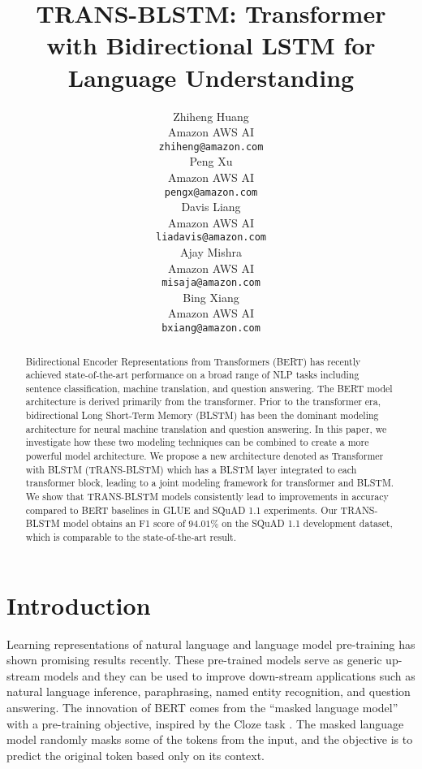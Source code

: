 \documentclass[11pt,a4paper]{article}
\title{TRANS-BLSTM: Transformer with Bidirectional LSTM for Language Understanding}
\author{Zhiheng Huang \\
  Amazon AWS AI \\
  \texttt{zhiheng@amazon.com} \\\And
  Peng Xu \\
  Amazon AWS AI \\
  \texttt{pengx@amazon.com} \\\And
  Davis Liang \\
  Amazon AWS AI \\
  \texttt{liadavis@amazon.com} \\\AND
  Ajay Mishra \\
  Amazon AWS AI \\
  \texttt{misaja@amazon.com} \\\And
  Bing Xiang \\
  Amazon AWS AI \\
  \texttt{bxiang@amazon.com} \\  
  }
\date{}
\begin{document}
\maketitle
\begin{abstract}
Bidirectional Encoder Representations from Transformers (BERT) has recently achieved state-of-the-art performance on a broad range of NLP tasks including sentence classification, machine translation, and question answering. The BERT model architecture is derived primarily from the transformer. Prior to the transformer era, bidirectional Long Short-Term Memory (BLSTM) has been the dominant modeling architecture for neural machine translation and question answering. In this paper, we investigate how these two modeling techniques can be combined to create a more powerful model architecture. We propose a new architecture denoted as Transformer with BLSTM (TRANS-BLSTM) which has a BLSTM layer integrated to each transformer block, leading to a joint modeling framework for transformer and BLSTM. We show that TRANS-BLSTM models consistently lead to improvements in accuracy compared to BERT baselines in GLUE and SQuAD 1.1 experiments. Our TRANS-BLSTM model obtains an F1 score of $94.01\%$ on the SQuAD 1.1 development dataset, which is comparable to the state-of-the-art result.
\end{abstract}

\section{Introduction}
Learning representations \cite{mikolov2013} of natural language and language model pre-training \cite{devlin2018,radford2019language} has shown promising results recently. These pre-trained models serve as generic up-stream models and they can be used to improve down-stream applications such as natural language inference, paraphrasing, named entity recognition, and question answering. The innovation of BERT \cite{devlin2018} comes from the ``masked language model'' with a pre-training objective, inspired by the Cloze task \cite{taylor1953}. The masked language model randomly masks some of the tokens from the input, and the objective is to predict the original token based only on its context. 
\end{document}
